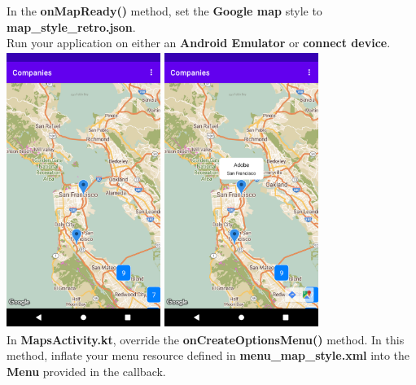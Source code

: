 \documentclass{article}
\begin{document}
In the \textbf{onMapReady()} method, set the \textbf{Google map} style to \textbf{map\_style\_retro.json}. \\

Run your application on either an \textbf{Android Emulator} or \textbf{connect device}. \\ 

\includegraphics[width=5cm, height=9cm]{../tex/img/practicals/05-companies-2.png} 
\includegraphics[width=5cm, height=9cm]{../tex/img/practicals/05-companies-3.png} \\

In \textbf{MapsActivity.kt}, override the \textbf{onCreateOptionsMenu()} method. In this method, inflate your menu resource defined in \textbf{menu\_map\_style.xml} into the \textbf{Menu} provided in the callback. \\
\end{document}
